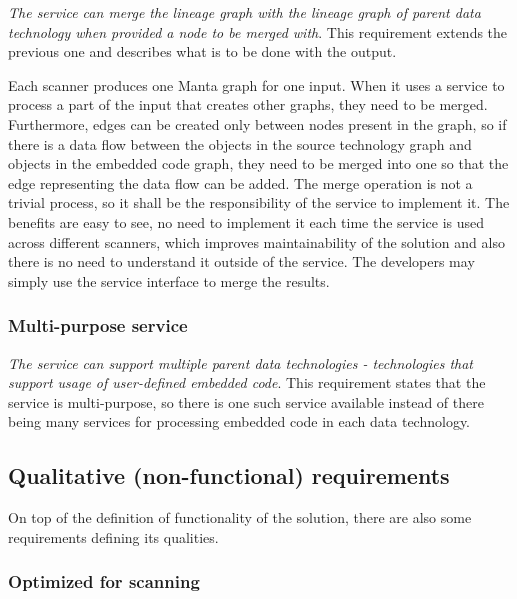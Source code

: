 \textit{The service can merge the lineage graph with the lineage graph of parent data technology when provided a node to be merged with}. This requirement extends the previous one and describes what is to be done with the output.
\par
Each scanner produces one Manta graph for one input. When it uses a service to process a part of the input that creates other graphs, they need to be merged. Furthermore, edges can be created only between nodes present in the graph, so if there is a data flow between the objects in the source technology graph and objects in the embedded code graph, they need to be merged into one so that the edge representing the data flow can be added. The merge operation is not a trivial process, so it shall be the responsibility of the service to implement it. The benefits are easy to see, no need to implement it each time the service is used across different scanners, which improves maintainability of the solution and also there is no need to understand it outside of the service. The developers may simply use the service interface to merge the results.

\subsubsection{Multi-purpose service}

\textit{The service can support multiple parent data technologies - technologies that support usage of user-defined embedded code}. This requirement states that the service is multi-purpose, so there is one such service available instead of there being many services for processing embedded code in each data technology.

\subsection{Qualitative (non-functional) requirements}

On top of the definition of functionality of the solution, there are also some requirements defining its qualities.

\subsubsection{Optimized for scanning}

